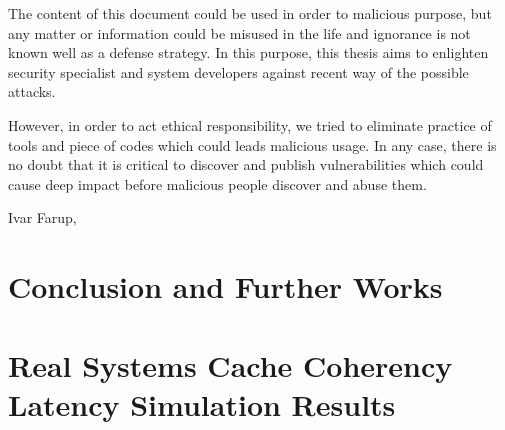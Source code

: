 \documentclass[medieteknikk]{gucmasterthesis}
\begin{document}
The content of this document could be used in order to malicious purpose, but any matter or information could be misused in the life and ignorance is not known well as a defense strategy. In this purpose, this thesis aims to enlighten security specialist and system developers against recent way of the possible attacks. 

However, in order to act ethical responsibility, we tried to eliminate practice of tools and piece of codes which could leads malicious usage. In any case, there is no doubt that it is critical to discover and publish vulnerabilities which could cause deep impact before malicious people discover and abuse them.


\vspace{\baselineskip}
\noindent Ivar Farup, \gucmasterthesisdate

\tableofcontents
\listoffigures
\listoftables







\chapter{Conclusion and Further Works}




\appendix

\chapter{Real Systems Cache Coherency Latency Simulation Results}
\end{document}

